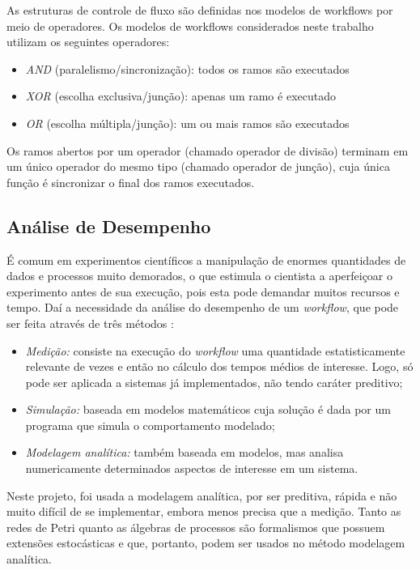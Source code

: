 \documentclass[a4paper,11pt]{article}
\begin{document}
        As estruturas de controle de fluxo são definidas nos modelos de workflows por meio de operadores. Os modelos de workflows considerados neste trabalho utilizam os seguintes operadores:
                
        \begin{itemize}
            \item \emph{AND} (paralelismo/sincronização): todos os ramos s\~ao executados
            \item \emph{XOR} (escolha exclusiva/junção): apenas um ramo \'e executado
            \item \emph{OR} (escolha múltipla/junção): um ou mais ramos s\~ao executados
        \end{itemize}

        Os ramos abertos por um operador (chamado operador de divis\~ao) terminam em um \'unico operador do mesmo tipo (chamado operador de junç\~ao), cuja \'unica funç\~ao \'e sincronizar o final dos ramos executados.

  	\subsection{Análise de Desempenho}
        É comum em experimentos científicos a manipulação de enormes quantidades de dados e processos muito demorados, o que estimula o cientista a aperfeiçoar o experimento antes de sua execução, pois esta pode demandar muitos recursos e tempo. Daí a necessidade da análise do desempenho de um \emph{workflow}, que pode ser feita através de três métodos \cite{phd:kelly11}:

  	\begin{itemize}
  		\item \emph{Medição:} consiste na execução do \emph{workflow} uma quantidade estatisticamente relevante de vezes e então no cálculo dos tempos médios de interesse. Logo, só pode ser aplicada a sistemas já implementados, não tendo caráter preditivo;

  		\item \emph{Simulação:} baseada em modelos matemáticos cuja solução é dada por um programa que simula o comportamento modelado;

  		\item \emph{Modelagem analítica:} também baseada em modelos, mas analisa numericamente determinados aspectos de interesse em um sistema.
  	\end{itemize}

  	Neste projeto, foi usada a modelagem analítica, por ser preditiva, rápida e não muito difícil de se implementar, embora menos precisa que a medição. Tanto as redes de Petri quanto as álgebras de processos são formalismos que possuem extensões estocásticas e que, portanto, podem ser usados no método modelagem analítica. 
\end{document}
